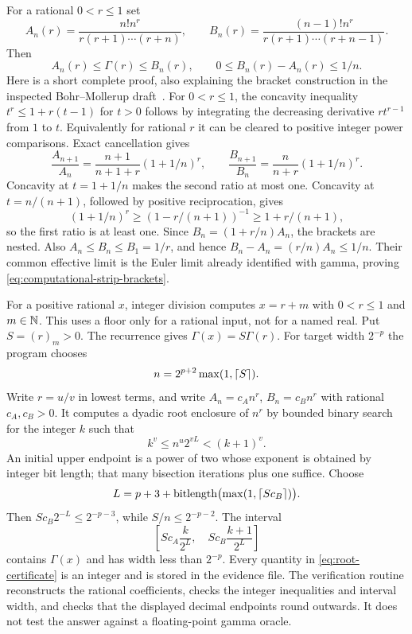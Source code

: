 For a rational $0<r\le1$ set
\[
 A_n(r)=\frac{n!n^r}{r(r+1)\cdots(r+n)},\qquad
 B_n(r)=\frac{(n-1)!n^r}{r(r+1)\cdots(r+n-1)}.
\]
Then
\begin{equation}
 A_n(r)\le\Gamma(r)\le B_n(r),\qquad
 0\le B_n(r)-A_n(r)\le1/n.
 \label{eq:computational-strip-brackets}
\end{equation}
Here is a short complete proof, also explaining the bracket construction
in the inspected Bohr--Mollerup draft~\cite{bmrepo}. For $0<r\le1$,
the concavity inequality $t^r\le1+r(t-1)$ for $t>0$ follows by
integrating the decreasing derivative $r t^{r-1}$ from $1$ to $t$.
Equivalently for rational $r$ it can be cleared to positive integer
power comparisons. Exact cancellation gives
\[
 \frac{A_{n+1}}{A_n}=
 \frac{n+1}{n+1+r}(1+1/n)^r,
 \qquad
 \frac{B_{n+1}}{B_n}=
 \frac{n}{n+r}(1+1/n)^r.
\]
Concavity at $t=1+1/n$ makes the second ratio at most one.
Concavity at $t=n/(n+1)$, followed by positive reciprocation, gives
\[
 (1+1/n)^r\ge(1-r/(n+1))^{-1}\ge1+r/(n+1),
\]
so the first ratio is at least one. Since
$B_n=(1+r/n)A_n$, the brackets are nested. Also
$A_n\le B_n\le B_1=1/r$, and hence
$B_n-A_n=(r/n)A_n\le1/n$. Their common effective limit is the
Euler limit already identified with gamma, proving
\eqref{eq:computational-strip-brackets}.

For a positive rational $x$, integer division computes
$x=r+m$ with $0<r\le1$ and $m\in\mathbb N$. This uses a floor only for
a rational input, not for a named real. Put $S=(r)_m>0$. The recurrence
gives $\Gamma(x)=S\Gamma(r)$. For target width $2^{-p}$ the program
chooses
\[
 n=2^{p+2}\max(1,\left\lceil S\right\rceil).
\]
Write $r=u/v$ in lowest terms, and write $A_n=c_A n^r$,
$B_n=c_B n^r$ with rational $c_A,c_B>0$. It computes a dyadic root
enclosure of $n^r$ by bounded binary search for the integer $k$ such that
\begin{equation}
 k^v\le n^u2^{vL}<(k+1)^v.\label{eq:root-certificate}
\end{equation}
An initial upper endpoint is a power of two whose exponent is obtained
by integer bit length; that many bisection iterations plus one suffice.
Choose
\[
 L=p+3+\operatorname{bitlength}
                    \bigl(\max(1,\left\lceil Sc_B\right\rceil)\bigr).
\]
Then $Sc_B2^{-L}\le2^{-p-3}$, while $S/n\le2^{-p-2}$.
The interval
\[
 \left[Sc_A\frac{k}{2^L},\quad
       Sc_B\frac{k+1}{2^L}\right]
\]
contains $\Gamma(x)$ and has width less than $2^{-p}$.
Every quantity in \eqref{eq:root-certificate} is an integer and is
stored in the evidence file. The verification routine reconstructs the
rational coefficients, checks the integer inequalities and interval
width, and checks that the displayed decimal endpoints round outwards.
It does not test the answer against a floating-point gamma oracle.

